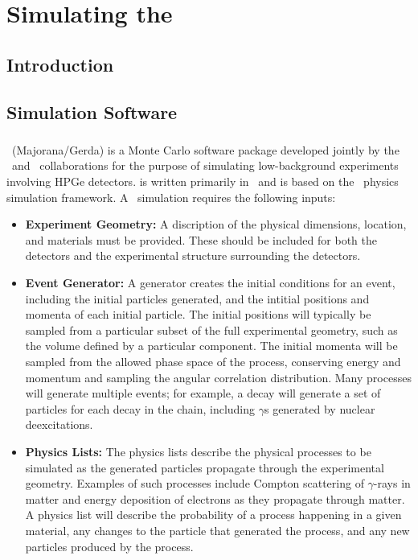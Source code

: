 \documentclass[/main.tex]{subfiles}
\begin{document}
\graphicspath{{./pics/}{ch3/pics/}}

\textpages
\chapter{Simulating the \MJD}

\section{Introduction}


\section{Simulation Software}
\subsection{\Mage}
\Mage\ (Majorana/Gerda) \cite{mage2011} is a Monte Carlo software package developed jointly by the \MJ\ and \Gerda\ collaborations for the purpose of simulating low-background experiments involving HPGe detectors.
\Mage is written primarily in \cpp\ and is based on the \geant\ physics simulation framework\cite{geant2003}.
A \geant\ simulation requires the following inputs:
\begin{itemize}
\item{\textbf{Experiment Geometry:}}
  A discription of the physical dimensions, location, and materials must be provided.
  These should be included for both the detectors and the experimental structure surrounding the detectors.
\item{\textbf{Event Generator:}}
  A generator creates the initial conditions for an event, including the initial particles generated, and the intitial positions and momenta of each initial particle.
  The initial positions will typically be sampled from a particular subset of the full experimental geometry, such as the volume defined by a particular component.
  The initial momenta will be sampled from the allowed phase space of the process, conserving energy and momentum and sampling the angular correlation distribution.
  Many processes will generate multiple events; for example, a  decay will generate a set of particles for each decay in the chain, including $\gamma$s generated by nuclear deexcitations.
\item{\textbf{Physics Lists:}}
  The physics lists describe the physical processes to be simulated as the generated particles propagate through the experimental geometry.
  Examples of such processes include Compton scattering of $\gamma$-rays in matter and energy deposition of electrons as they propagate through matter.
  A physics list will describe the probability of a process happening in a given material, any changes to the particle that generated the process, and any new particles produced by the process.
\end{itemize}
\end{document}
